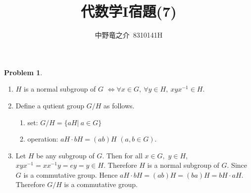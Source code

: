 \documentclass[a4paper, 12pt, fleqn]{article}
\title{代数学I宿題(7)}
\author{中野竜之介\ 8310141H}
\theoremstyle{definition}
\newtheorem{prb}{Problem}
\begin{document}
\maketitle

\begin{prb}
    $ $
    \begin{enumerate}
        \item $H$ is a normal subgroup of $G$
                $\Leftrightarrow\forall x\in G,\ \forall y \in H,\ xyx^{-1}\in H$.

        \item Define a qutient group $G/H$ as follows.
            \begin{enumerate}
                \item set: $G/H=\{aH|\ a\in G\}$
                \item operation: $aH\cdot bH = (ab)H$ $(a,b\in G)$.
            \end{enumerate}

        \item Let $H$ be any subgroup of $G$. Then for all $x\in G,$ $y\in H$, $xyx^{-1} = xx^{-1}y = ey = y\in H$. Therefore $H$ is a normal subgroup of $G$.
         Since $G$ is a commutative group. Hence $aH\cdot bH=(ab)H=(ba)H=bH\cdot aH$. Therefore $G/H$ is a commutative group.
    \end{enumerate}
\end{prb}
\end{document}
